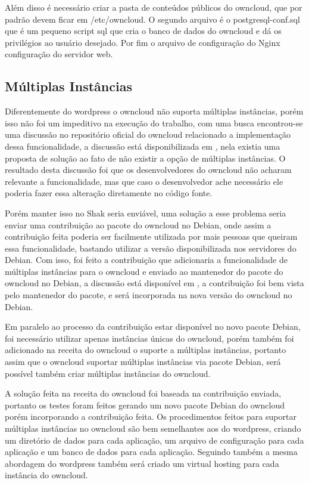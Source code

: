 Além disso é necessário criar a pasta de conteúdos públicos do owncloud, que por
padrão devem ficar em /etc/owncloud. O segundo arquivo é o postgresql-conf.sql
que é um pequeno script sql que cria o banco de dados do owncloud e dá os
privilégios ao usuário desejado. Por fim o arquivo de configuração do Nginx
configuração do servidor web.

\subsection{Múltiplas Instâncias}

Diferentemente do wordpress o owncloud não suporta múltiplas instâncias, porém isso
não foi um impeditivo na execução do trabalho, com uma busca encontrou-se uma discussão no repositório
oficial do owncloud relacionado a implementação dessa funcionalidade, a discussão está
disponibilizada em \href{https://github.com/owncloud/core/pull/16424}, nela existia
uma proposta de solução ao fato de não existir a opção de múltiplas instâncias. O
resultado desta discussão foi que os desenvolvedores do owncloud não acharam relevante
a funcionalidade, mas que caso o desenvolvedor ache necessário ele poderia fazer essa
alteração diretamente no código fonte.

Porém manter isso no Shak seria enviável, uma solução a esse problema seria enviar
uma contribuição ao pacote do owncloud no Debian, onde assim a contribuição feita
poderia ser facilmente utilizada por mais pessoas que queiram essa funcionalidade,
bastando utilizar a versão disponibilizada nos servidores do Debian. Com isso, foi
feito a contribuição que adicionaria a funcionalidade de múltiplas instâncias para
o owncloud e enviado ao mantenedor do pacote do owncloud no Debian,
a discussão está disponível em \href{https://bugs.debian.org/cgi-bin/bugreport.cgi?bug=789726},
a contribuição foi bem vista pelo mantenedor do pacote, e será incorporada na nova
versão do owncloud no Debian.

Em paralelo ao processo da contribuição estar disponível no novo pacote Debian,
foi necessário utilizar apenas instâncias únicas do owncloud, porém também foi
adicionado na receita do owncloud o suporte a múltiplas instâncias, portanto
assim que o owncloud suportar múltiplas instâncias via pacote Debian, será possível
também criar múltiplas instâncias do owncloud.

A solução feita na receita do owncloud foi baseada na contribuição enviada, portanto
os testes foram feitos gerando um novo pacote Debian do owncloud porém incorporando
a contribuição feita. Os procedimentos feitos para suportar múltiplas instâncias
no owncloud são bem semelhantes aos do wordpress, criando um diretório de dados
para cada aplicação, um arquivo de configuração para cada aplicação e um banco de
dados para cada aplicação. Seguindo também a mesma abordagem do wordpress também
será criado um virtual hosting para cada instância do owncloud.

